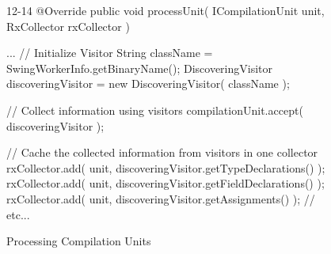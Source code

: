 \begin{figure}[H]
\begin{sourcecode}
\begin{javacode}{12-14}
@Override
public void processUnit( ICompilationUnit unit, RxCollector rxCollector ) {
	...
	// Initialize Visitor
	String className = SwingWorkerInfo.getBinaryName();
	DiscoveringVisitor discoveringVisitor = new DiscoveringVisitor( className );

	// Collect information using visitors
	compilationUnit.accept( discoveringVisitor );

	// Cache the collected information from visitors in one collector
	rxCollector.add( unit, discoveringVisitor.getTypeDeclarations() );
	rxCollector.add( unit, discoveringVisitor.getFieldDeclarations() );
	rxCollector.add( unit, discoveringVisitor.getAssignments() );
	// etc...
}
\end{javacode}
\caption{\toolextension{} Processing Compilation Units}
\label{code:processing}
\end{sourcecode}
\end{figure}
